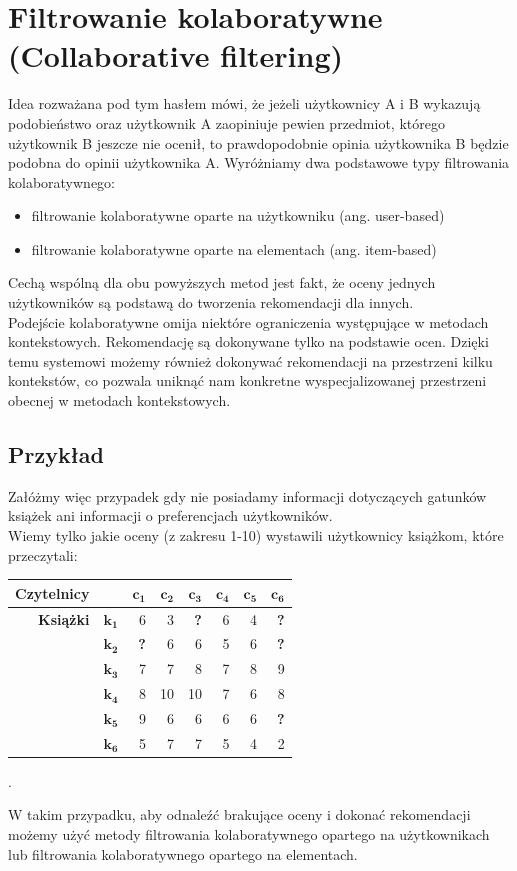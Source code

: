 \documentclass[12pt,a4paper]{report}
\begin{document}
\section{Filtrowanie kolaboratywne (Collaborative filtering)}

Idea rozważana pod tym hasłem mówi, że jeżeli użytkownicy A i B wykazują podobieństwo oraz użytkownik A zaopiniuje pewien przedmiot, którego użytkownik B jeszcze nie ocenił, to prawdopodobnie opinia użytkownika B będzie podobna do opinii użytkownika A. Wyróżniamy dwa podstawowe typy filtrowania kolaboratywnego:
\begin{itemize}
\item filtrowanie kolaboratywne oparte na użytkowniku (ang. user-based)
\item filtrowanie kolaboratywne oparte na  elementach (ang. item-based)
\end{itemize}
Cechą wspólną dla obu powyższych metod jest fakt, że oceny jednych użytkowników są podstawą do tworzenia rekomendacji dla innych. 
\\Podejście kolaboratywne omija niektóre ograniczenia występujące w metodach kontekstowych. Rekomendację są dokonywane tylko na podstawie ocen. Dzięki temu systemowi możemy również dokonywać rekomendacji na przestrzeni kilku kontekstów, co pozwala uniknąć nam konkretne wyspecjalizowanej przestrzeni obecnej w metodach kontekstowych.
\subsection{Przykład}
Załóżmy więc przypadek gdy nie posiadamy informacji dotyczących gatunków książek ani informacji o preferencjach użytkowników.
\\Wiemy tylko jakie oceny (z zakresu 1-10) wystawili użytkownicy książkom, które przeczytali:
\begin{center}
\begin{tabular}{|r|r|r|r|r|r|r|r|} \hline
\textbf{Czytelnicy} & & $\mathbf{c_1}$ & $\mathbf{c_2}$ & $\mathbf{c_3}$ & $\mathbf{c_4}$ & $\mathbf{c_5}$ & $\mathbf{c_6}$\\
\hline
\hline
\textbf{Książki} &$\mathbf{k_1}$ & 6 & 3 & \textbf{?} & 6 & 4 & \textbf{?}\\
\hline
&$\mathbf{k_2}$ & \textbf{?} & 6 & 6 & 5 & 6 & \textbf{?}\\
\hline
&$\mathbf{k_3}$ & 7 & 7 & 8 & 7 & 8 & 9 \\
\hline
&$\mathbf{k_4}$ & 8 & 10 & 10 & 7 & 6 & 8\\
\hline
&$\mathbf{k_5}$ & 9 & 6 & 6 & 6 & 6 & \textbf{?} \\
\hline
&$\mathbf{k_6}$ & 5 & 7 & 7 & 5 & 4 & 2\\
\hline
\end{tabular}.
\end{center}
W takim przypadku, aby odnaleźć brakujące oceny i dokonać rekomendacji możemy użyć metody filtrowania kolaboratywnego opartego na użytkownikach lub filtrowania kolaboratywnego opartego na elementach.
\end{document}

